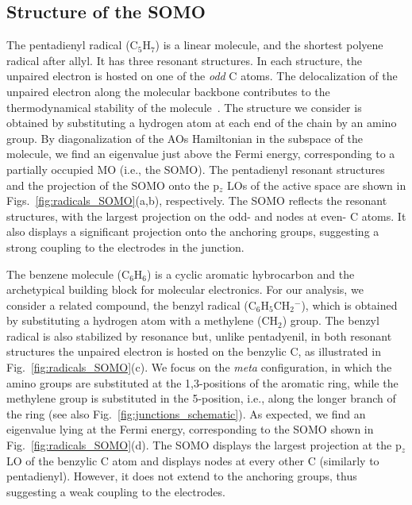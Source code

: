 \documentclass[aps,prx,twocolumn,superscriptaddress]{revtex4-2}
\begin{document}
\subsection{Structure of the SOMO} \label{sec:SOMO}
The pentadienyl radical (C$_5$H$_7$) is a linear molecule, and the shortest polyene radical after allyl. 
It has three resonant structures. 
In each structure, the unpaired electron is hosted on one of the \emph{odd} C atoms. 
The delocalization of the unpaired electron along the molecular backbone contributes 
to the thermodynamical stability of the molecule~\cite{clark1991studies,chalyavi2011spectroscopy}. 
The structure we consider is obtained by substituting a hydrogen atom at each end of the chain by an amino group. 
By diagonalization of the AOs Hamiltonian in the subspace of the molecule, 
we find an eigenvalue just above the Fermi energy, corresponding to a partially occupied MO (i.e., the SOMO). 
The pentadienyl resonant structures and the projection of the SOMO onto the p$_z$ LOs of the active space 
are shown in Figs.~\ref{fig:radicals_SOMO}(a,b), respectively. 
The SOMO reflects the resonant structures, with the largest projection on the odd- and nodes at even- C atoms. 
It also displays a significant projection onto the anchoring groups, 
suggesting a strong coupling to the electrodes in the junction.  

The benzene molecule (C$_6$H$_6$) is a cyclic aromatic hybrocarbon 
and the archetypical building block for molecular electronics. 
For our analysis, we consider a related compound, the benzyl radical ({C$_6$H$_5$CH$_2$}$^{-}$), 
which is obtained by substituting a hydrogen atom with a methylene (CH$_2$) group. 
The benzyl radical is also stabilized by resonance but, unlike pentadyenil, 
in both resonant structures the unpaired electron is hosted on the benzylic C, 
as illustrated in Fig.~\ref{fig:radicals_SOMO}(c). 
We focus on the \emph{meta} configuration, in which the amino groups are substituted at the 1,3-positions of the aromatic ring,  
while the methylene group is substituted in the 5-position, 
i.e., along the longer branch of the ring (see also Fig.~\ref{fig:junctions_schematic}). 
As expected, we find an eigenvalue lying at the Fermi energy, corresponding to the SOMO 
shown in Fig.~\ref{fig:radicals_SOMO}(d). 
The SOMO displays the largest projection at the p$_z$ LO of the benzylic C atom
and displays nodes at every other C (similarly to pentadienyl).  
However, it does not extend to the anchoring groups, thus suggesting a weak coupling to the electrodes. 
\end{document}
